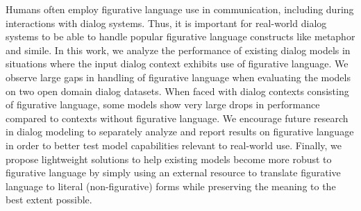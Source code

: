 Humans often employ figurative language use in communication, including during interactions with dialog systems. Thus, it is important for real-world dialog systems to be able to handle popular figurative language constructs like metaphor and simile. In this work, we analyze the performance of existing dialog models in situations where the input dialog context exhibits use of figurative language. We observe large gaps in handling of figurative language when evaluating the models on two open domain dialog datasets. When faced with dialog contexts consisting of figurative language, some models show very large drops in performance compared to contexts without figurative language. We encourage future research in dialog modeling to separately analyze and report results on figurative language in order to better test model capabilities relevant to real-world use. Finally, we propose lightweight solutions to help existing models become more robust to figurative language by simply using an external resource to translate figurative language to literal (non-figurative) forms while preserving the meaning to the best extent possible.
